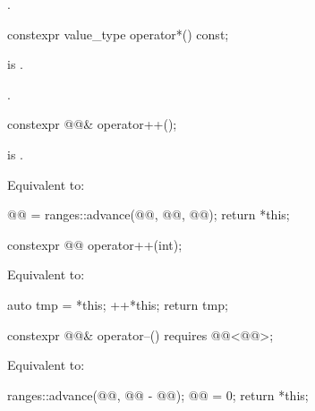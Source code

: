 \begin{itemdescr}
\pnum
\returns
{}.
\end{itemdescr}

%
\begin{itemdecl}
constexpr value_type operator*() const;
\end{itemdecl}

\begin{itemdescr}
\pnum
\expects
{} is .

\pnum
\returns
{}.
\end{itemdescr}

%
\begin{itemdecl}
constexpr @@& operator++();
\end{itemdecl}

\begin{itemdescr}
\pnum
\expects
{} is .

\pnum
\effects
Equivalent to:
\begin{codeblock}
@@ = ranges::advance(@@, @@, @@);
return *this;
\end{codeblock}
\end{itemdescr}

%
\begin{itemdecl}
constexpr @@ operator++(int);
\end{itemdecl}

\begin{itemdescr}
\pnum
\effects
Equivalent to:
\begin{codeblock}
auto tmp = *this;
++*this;
return tmp;
\end{codeblock}
\end{itemdescr}

%
\begin{itemdecl}
constexpr @@& operator--() requires @@<@@>;
\end{itemdecl}

\begin{itemdescr}
\pnum
\effects
Equivalent to:
\begin{codeblock}
ranges::advance(@@, @@ - @@);
@@ = 0;
return *this;
\end{codeblock}
\end{itemdescr}

